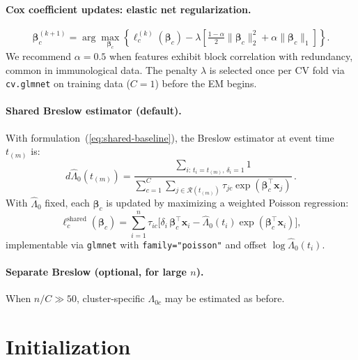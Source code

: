 \documentclass[11pt]{article}
\newcommand{\bx}{\mathbf{x}}
\newcommand{\bbeta}{\boldsymbol{\beta}}
\newenvironment{revblock}{\color{revcolor}}{}
\begin{document}
\begin{revblock}
\paragraph{Cox coefficient updates: elastic net regularization.}
\begin{equation}
  \bbeta_c^{(k+1)} = \arg\max_{\bbeta_c}\left\{\ell_c^{(k)}(\bbeta_c) - \lambda\!\left[\tfrac{1-\alpha}{2}\|\bbeta_c\|_2^2 + \alpha\|\bbeta_c\|_1\right]\right\}.
\end{equation}
We recommend $\alpha = 0.5$ when features exhibit block correlation with redundancy, common in immunological data. The penalty $\lambda$ is selected once per CV fold via \texttt{cv.glmnet} on training data ($C\!=\!1$) before the EM begins.
\end{revblock}

\begin{revblock}
\paragraph{Shared Breslow estimator (default).}
With formulation~(\ref{eq:shared-baseline}), the Breslow estimator at event time $t_{(m)}$ is:
\begin{equation}
  d\hat{\Lambda}_0(t_{(m)}) = \frac{\sum_{i:\,t_i=t_{(m)},\,\delta_i=1} 1}{\sum_{c=1}^C \sum_{j\in\mathcal{R}(t_{(m)})} \tau_{jc}\exp(\bbeta_c^\top\bx_j)}\,.
\end{equation}
With $\hat{\Lambda}_0$ fixed, each $\bbeta_c$ is updated by maximizing a weighted Poisson regression:
\begin{equation}
  \ell_c^{\mathrm{shared}}(\bbeta_c) = \sum_{i=1}^n \tau_{ic}\bigl[\delta_i\,\bbeta_c^\top\bx_i - \hat{\Lambda}_0(t_i)\exp(\bbeta_c^\top\bx_i)\bigr],
\end{equation}
implementable via \texttt{glmnet} with \texttt{family="poisson"} and offset $\log\hat{\Lambda}_0(t_i)$.
\end{revblock}

\paragraph{Separate Breslow (optional, for large $n$).}
When $n/C \gg 50$, cluster-specific $\Lambda_{0c}$ may be estimated as before.


\section{Initialization}
\end{document}

